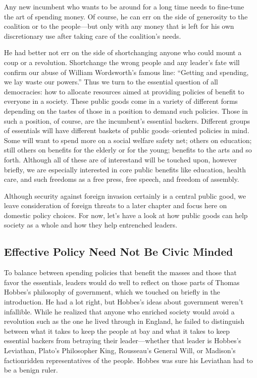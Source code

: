 \documentclass[10pt]{article}
\begin{document}
{\large Any new incumbent who wants to be around for a long time needs to
fine-tune the art of spending money. Of course, he can err on the side of
generosity to the coalition or to the people---but only with any money that is
left for his own discretionary use after taking care of the coalition's needs.}

{\large He had better not err on the side of shortchanging anyone who could
mount a coup or a revolution. Shortchange the wrong people and any leader's fate
will confirm our abuse of William Wordsworth's famous line: ``Getting and
spending, we lay waste our powers.'' Thus we turn to the essential question of
all democracies: how to allocate resources aimed at providing policies of benefit
to everyone in a society. These public goods come in a variety of different forms
depending on the tastes of those in a position to demand such policies. Those in
such a position, of course, are the incumbent's essential backers. Different
groups of essentials will have different baskets of public goods--oriented
policies in mind. Some will want to spend more on a social welfare safety net;
others on education; still others on benefits for the elderly or for the young;
benefits to the arts and so forth. Although all of these are of interestand will
be touched upon, however briefly, we are especially interested in core public
benefits like education, health care, and such freedoms as a free press, free
speech, and freedom of assembly.}

{\large Although security against foreign invasion certainly is a central public
good, we leave consideration of foreign threats to a later chapter and focus here
on domestic policy choices. For now, let's have a look at how public goods can
help society as a whole and how they help entrenched leaders.}

\subsection{Effective Policy Need Not Be Civic Minded}

{\large To balance between spending policies that benefit the masses and those
that favor the essentials, leaders would do well to reflect on those parts of
Thomas Hobbes's philosophy of government, which we touched on briefly in the
introduction. He had a lot right, but Hobbes's ideas about government weren't
infallible. While he realized that anyone who enriched society would avoid a
revolution such as the one he lived through in England, he failed to distinguish
between what it takes to keep the people at bay and what it takes to keep
essential backers from betraying their leader---whether that leader is Hobbes's
Leviathan, Plato's Philosopher King, Rousseau's General Will, or Madison's
factionridden representatives of the people. Hobbes was sure his Leviathan had to
be a benign ruler.}
\end{document}
